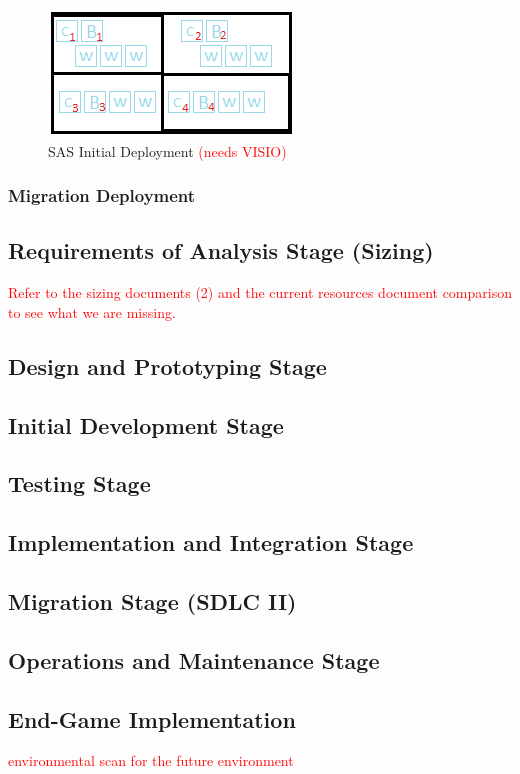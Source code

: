 \begin{figure}[H]
    \centering
    \includegraphics[scale = 1]{images/sas-initial-deployment.png}
    \caption{SAS Initial Deployment \textcolor{red}{(needs VISIO)} }
    \label{SAS Initial Deployment}
\end{figure}


\subsubsection{Migration Deployment}
\textcolor{red}{\lipsum[1-1]}

\subsection{Requirements of Analysis Stage (Sizing)}
\textcolor{red}{Refer to the sizing documents (2) and the current resources document comparison to see what we are missing.}


\subsection{Design and Prototyping Stage}

\subsection{Initial Development Stage}

\subsection{Testing Stage}

\subsection{Implementation and Integration Stage}

\subsection{Migration Stage (SDLC II)}

\subsection{Operations and Maintenance Stage}

\subsection{End-Game Implementation}
\textcolor{red}{environmental scan for the future environment}